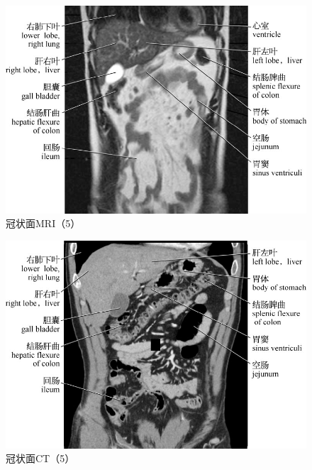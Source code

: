 \begin{figure}[!htbp]
 \centering
 \includegraphics{./images/Image00104.jpg}
 \captionsetup{justification=centering}
 \caption{冠状面MRI（5）}
  \end{figure} 
 \FloatBarrier

\begin{figure}[!htbp]
 \centering
 \includegraphics{./images/Image00105.jpg}
 \captionsetup{justification=centering}
 \caption{冠状面CT（5）}
  \end{figure} 
 \FloatBarrier

